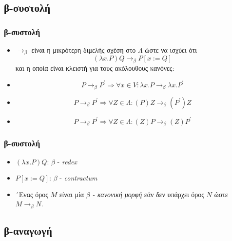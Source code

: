 \documentclass{beamer}
\begin{document}
\subsection{β-συστολή}

\begin{frame}
        \frametitle{β-συστολή}
        \begin{itemize}
        	
            \item $\rightarrow _\beta$ είναι η μικρότερη διμελής σχέση στο $\Lambda$ ώστε να ισχύει ότι 
                  $$(\lambda x . P)Q \rightarrow _\beta P[x:=Q]$$
            \pause
                  και η οποία είναι κλειστή για τους ακόλουθους κανόνες:
            \pause
            \item $$P \rightarrow _\beta P^{\prime}  \Rightarrow \forall x \in V : \lambda x . P \rightarrow _\beta \lambda x .    P^{\prime}$$
            \pause
            \item $$P \rightarrow _\beta P^{\prime}  \Rightarrow \forall Z \in \Lambda : (P)Z \rightarrow _\beta (P^{\prime})Z$$
			\pause
            \item $$P \rightarrow _\beta P^{\prime}  \Rightarrow \forall Z \in \Lambda : (Z)P \rightarrow _\beta (Z)P^{\prime}$$
            
        \end{itemize}
\end{frame}

\begin{frame}
        \frametitle{β-συστολή}
        \begin{itemize}
        	
            \item $(\lambda x . P)Q$: $\beta$ - \textit{redex}
            \pause
			\item $P[x:=Q]$: $\beta$ - \textit{contractum}
            \pause
            \item ´Ενας όρος $M$ είναι μία \textit{$\beta$ - κανονική μορφή} εάν δεν υπάρχει όρος $N$ ώστε $M \rightarrow _\beta N$.
            
        \end{itemize}
\end{frame}

\subsection{β-αναγωγή}
\end{document}
